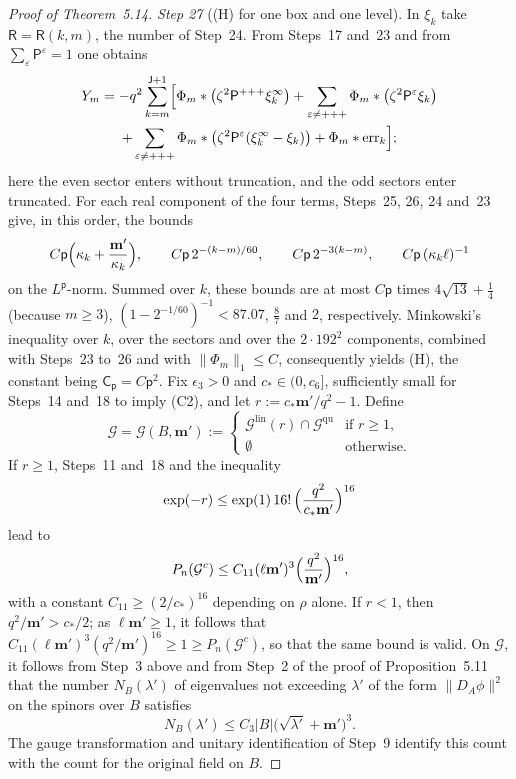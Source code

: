 \documentclass[11pt,letterpaper,reqno]{amsart}
\theoremstyle{definition}
\begin{document}
\begin{proof}[Proof of Theorem~5.14]
\emph{Step 27} ((H) for one box and one level).
In $\xi_k$ take $\mathsf R=\mathsf R(k,m)$, the number of Step~24.
From Steps~17 and~23 and from $\sum_\varepsilon\mathsf P^\varepsilon=1$ one obtains
\begin{multline*}
Y_m=-q^2\sum_{k=m}^{\mathsf J+1}\Bigl[\Phi_m*\bigl(\zeta^2\mathsf P^{+++}\xi_k^\infty\bigr)+\sum_{\varepsilon\ne+++}\Phi_m*\bigl(\zeta^2\mathsf P^\varepsilon\xi_k\bigr)\\
+\sum_{\varepsilon\ne+++}\Phi_m*\bigl(\zeta^2\mathsf P^\varepsilon(\xi_k^\infty-\xi_k)\bigr)+\Phi_m*\mathrm{err}_k\Bigr];
\end{multline*}
here the even sector enters without truncation, and the odd sectors enter truncated.
For each real component of the four terms, Steps~25, 26, 24 and~23 give, in this order, the bounds
\begin{equation*}
C\mathsf p\Bigl(\kappa_k+\frac{\mathbf m'}{\kappa_k}\Bigr),\qquad C\mathsf p\,2^{-(k-m)/60},\qquad C\mathsf p\,2^{-3(k-m)},\qquad C\mathsf p\,(\kappa_k\ell)^{-1}
\end{equation*}
on the $L^{\mathsf p}$-norm.
Summed over $k$, these bounds are at most $C\mathsf p$ times $4\sqrt{13}+\frac14$ (because $m\ge3$), $(1-2^{-1/60})^{-1}<87.07$, $\frac87$ and $2$, respectively.
Minkowski's inequality over $k$, over the sectors and over the $2\cdot192^2$ components, combined with Steps~23 to~26 and with $\|\Phi_m\|_1\le C$, consequently yields (H), the constant being $\mathsf C_{\mathsf p}=C\mathsf p^2$.
Fix $\epsilon_3>0$ and $c_*\in(0,c_6]$, sufficiently small for Steps~14 and~18 to imply (C2), and let $r:=c_*\mathbf m'/q^2-1$.
Define
\begin{equation*}
\mathcal G=\mathcal G(B,\mathbf m'):=\begin{cases}\mathcal G^{\mathrm{lin}}(r)\cap\mathcal G^{\mathrm{qu}}&\text{if }r\ge1,\\\emptyset&\text{otherwise.}\end{cases}
\end{equation*}
If $r\ge1$, Steps~11 and~18 and the inequality
\begin{equation*}
\exp(-r)\le\exp(1)\,16!\,\Bigl(\frac{q^2}{c_*\mathbf m'}\Bigr)^{16}
\end{equation*}
lead to
\begin{equation*}
P_n(\mathcal G^c)\le C_{11}(\ell\mathbf m')^3\Bigl(\frac{q^2}{\mathbf m'}\Bigr)^{16},
\end{equation*}
with a constant $C_{11}\ge(2/c_*)^{16}$ depending on $\rho$ alone.
If $r<1$, then $q^2/\mathbf m'>c_*/2$; as $\ell\mathbf m'\ge1$, it follows that $C_{11}(\ell\mathbf m')^3(q^2/\mathbf m')^{16}\ge1\ge P_n(\mathcal G^c)$, so that the same bound is valid.
On $\mathcal G$, it follows from Step~3 above and from Step~2 of the proof of Proposition~5.11 that the number $N_B(\lambda')$ of eigenvalues not exceeding $\lambda'$ of the form $\|D_A\phi\|^2$ on the spinors over $B$ satisfies
\begin{equation*}
N_B(\lambda')\le C_3|B|\bigl(\sqrt{\lambda'}+\mathbf m'\bigr)^3.
\end{equation*}
The gauge transformation and unitary identification of Step~9 identify
this count with the count for the original field on $B$.


\end{proof}
\end{document}
